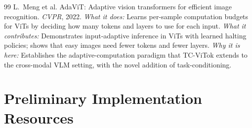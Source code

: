 \documentclass[11pt,twocolumn]{article}
\begin{document}
\begin{thebibliography}{99}
L.~Meng et al.
\newblock AdaViT: Adaptive vision transformers for efficient image recognition.
\newblock \textit{CVPR}, 2022.
\newblock \textit{What it does:} Learns per-sample computation budgets for ViTs by deciding how many tokens and layers to use for each input.
\newblock \textit{What it contributes:} Demonstrates input-adaptive inference in ViTs with learned halting policies; shows that easy images need fewer tokens and fewer layers.
\newblock \textit{Why it is here:} Establishes the adaptive-computation paradigm that TC-ViTok extends to the cross-modal VLM setting, with the novel addition of task-conditioning.

\end{thebibliography}

\section{Preliminary Implementation Resources}
\label{sec:resources}
\end{document}
